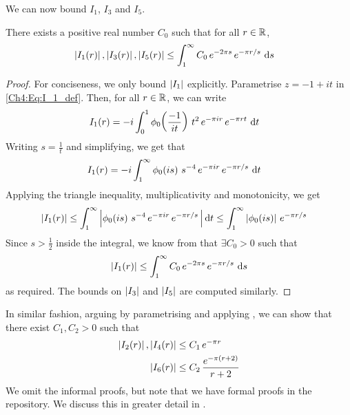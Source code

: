 We can now bound $I_1$, $I_3$ and $I_5$.

\begin{boxlemma}\label{Ch4:Lemma:Bound_I1_I3_I5}
    There exists a positive real number $C_0$ such that for all $r \in \mathbb{R}$,
    \begin{align}
        \left\lvert I_1(r) \right\rvert, \left\lvert I_3(r) \right\rvert, \left\lvert I_5(r) \right\rvert &\leq \int_{1}^{\infty} C_0 \, e^{-2\pi s} \, e^{-\pi r/s} \, \operatorname{d}\!{s}
        \label{Ch4:Eq:Bound_I1_I3_I5}
    \end{align}
\end{boxlemma}
\begin{proof}
    For conciseness, we only bound $\left\lvert I_1 \right\rvert$ explicitly. Parametrise $z = -1 + it$ in \eqref{Ch4:Eq:I_1_def}. Then, for all $r \in \mathbb{R}$, we can write
    \begin{align*}
        I_1(r) &= -i \int_{0}^{1}
            \phi_0\!\left( \frac{-1}{it} \right) \,
            t^2 \,
            e^{-\pi i r} \,
            e^{-\pi r t}\,
            \operatorname{d}\!{t}
    \end{align*}
    Writing $s = \frac{1}{t}$ and simplifying, we get that
    \begin{align*}
        I_1(r) &= -i \int_{1}^{\infty}
            \phi_0\!\left( is \right) \,
            s^{-4} \,
            e^{-\pi i r} \,
            e^{-\pi r / s}\,
            \operatorname{d}\!{t}
    \end{align*}
    Applying the triangle inequality, multiplicativity and monotonicity, we get
    \begin{align*}
        \left\lvert I_1(r) \right\rvert &\leq \int_{1}^{\infty} \left\lvert 
            \phi_0\!\left( is \right) \,
            s^{-4} \,
            e^{-\pi i r} \,
            e^{-\pi r / s}\,
             \right\rvert \operatorname{d}\!{t}
        \leq \int_{1}^{\infty}
            \left\lvert \phi_0\!\left( is \right) \right\rvert \,
            e^{-\pi r/s}
    \end{align*}
    Since $s > \frac{1}{2}$ inside the integral, we know from  that $\exists C_0 > 0$ such that
    \begin{align*}
        \left\lvert I_1(r) \right\rvert \leq \int_{1}^{\infty} C_0 \, e^{-2\pi s} \, e^{-\pi r/s} \, \operatorname{d}\!{s}
    \end{align*}
    as required. The bounds on $\left\lvert I_3 \right\rvert$ and $\left\lvert I_5 \right\rvert$ are computed similarly.
\end{proof}

In similar fashion, arguing by parametrising and applying , we can show that there exist $C_1, C_2 > 0$ such that
\begin{align}
    \left\lvert I_2(r) \right\rvert, \left\lvert I_4(r) \right\rvert &\leq C_1 \, e^{-\pi r} \label{Ch4:Eq:Bound_I2_I4} \\
    \left\lvert I_6(r) \right\rvert &\leq C_2 \, \frac{e^{-\pi \left( r + 2 \right)}}{r + 2} \label{Ch4:Eq:Bound_I6}
\end{align}
We omit the informal proofs, but note that we have formal proofs in the repository. We discuss this in greater detail in .

